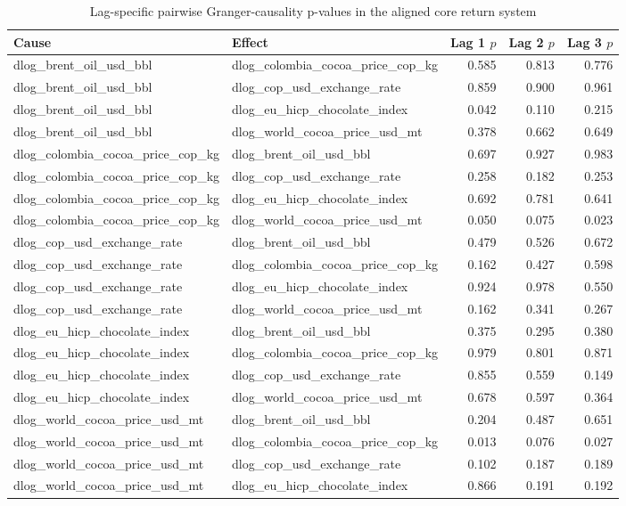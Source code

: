 \begin{table}
\caption{Lag-specific pairwise Granger-causality p-values in the aligned core return system}
\label{tab:supp_granger}
\begin{tabular}{llrrr}
\toprule
Cause & Effect & Lag 1 $p$ & Lag 2 $p$ & Lag 3 $p$ \\
\midrule
dlog_brent_oil_usd_bbl & dlog_colombia_cocoa_price_cop_kg & 0.585 & 0.813 & 0.776 \\
dlog_brent_oil_usd_bbl & dlog_cop_usd_exchange_rate & 0.859 & 0.900 & 0.961 \\
dlog_brent_oil_usd_bbl & dlog_eu_hicp_chocolate_index & 0.042 & 0.110 & 0.215 \\
dlog_brent_oil_usd_bbl & dlog_world_cocoa_price_usd_mt & 0.378 & 0.662 & 0.649 \\
dlog_colombia_cocoa_price_cop_kg & dlog_brent_oil_usd_bbl & 0.697 & 0.927 & 0.983 \\
dlog_colombia_cocoa_price_cop_kg & dlog_cop_usd_exchange_rate & 0.258 & 0.182 & 0.253 \\
dlog_colombia_cocoa_price_cop_kg & dlog_eu_hicp_chocolate_index & 0.692 & 0.781 & 0.641 \\
dlog_colombia_cocoa_price_cop_kg & dlog_world_cocoa_price_usd_mt & 0.050 & 0.075 & 0.023 \\
dlog_cop_usd_exchange_rate & dlog_brent_oil_usd_bbl & 0.479 & 0.526 & 0.672 \\
dlog_cop_usd_exchange_rate & dlog_colombia_cocoa_price_cop_kg & 0.162 & 0.427 & 0.598 \\
dlog_cop_usd_exchange_rate & dlog_eu_hicp_chocolate_index & 0.924 & 0.978 & 0.550 \\
dlog_cop_usd_exchange_rate & dlog_world_cocoa_price_usd_mt & 0.162 & 0.341 & 0.267 \\
dlog_eu_hicp_chocolate_index & dlog_brent_oil_usd_bbl & 0.375 & 0.295 & 0.380 \\
dlog_eu_hicp_chocolate_index & dlog_colombia_cocoa_price_cop_kg & 0.979 & 0.801 & 0.871 \\
dlog_eu_hicp_chocolate_index & dlog_cop_usd_exchange_rate & 0.855 & 0.559 & 0.149 \\
dlog_eu_hicp_chocolate_index & dlog_world_cocoa_price_usd_mt & 0.678 & 0.597 & 0.364 \\
dlog_world_cocoa_price_usd_mt & dlog_brent_oil_usd_bbl & 0.204 & 0.487 & 0.651 \\
dlog_world_cocoa_price_usd_mt & dlog_colombia_cocoa_price_cop_kg & 0.013 & 0.076 & 0.027 \\
dlog_world_cocoa_price_usd_mt & dlog_cop_usd_exchange_rate & 0.102 & 0.187 & 0.189 \\
dlog_world_cocoa_price_usd_mt & dlog_eu_hicp_chocolate_index & 0.866 & 0.191 & 0.192 \\
\bottomrule
\end{tabular}
\end{table}
